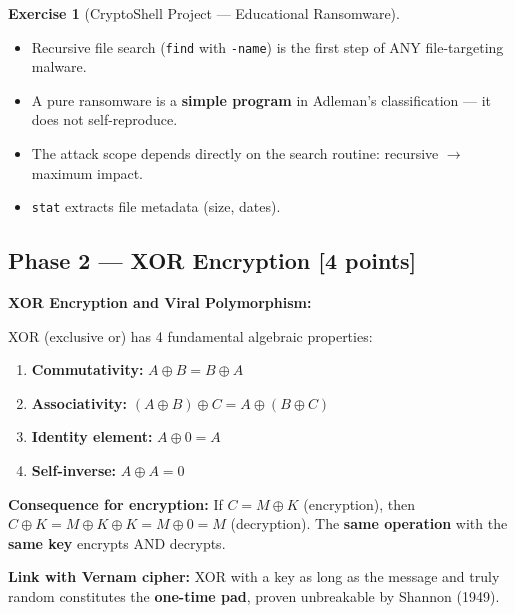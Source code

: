 \documentclass[a4paper,11pt]{article}
\theoremstyle{plain}
\theoremstyle{definition}
\newtheorem{exercice}{Exercise}
\begin{document}
\begin{exercice}[CryptoShell Project --- Educational Ransomware]
\begin{correction}
\begin{pointcle}
\begin{itemize}
    \item Recursive file search (\texttt{find} with \texttt{-name}) is the first step of ANY file-targeting malware.
    \item A pure ransomware is a \textbf{simple program} in Adleman's classification --- it does not self-reproduce.
    \item The attack scope depends directly on the search routine: recursive $\to$ maximum impact.
    \item \texttt{stat} extracts file metadata (size, dates).
\end{itemize}
\end{pointcle}

\end{correction}



\subsection*{Phase 2 --- XOR Encryption \hfill \normalsize [4 points]}

\begin{rappel}
\textbf{XOR Encryption and Viral Polymorphism:}

XOR (exclusive or) has 4 fundamental algebraic properties:
\begin{enumerate}
    \item \textbf{Commutativity:} $A \oplus B = B \oplus A$
    \item \textbf{Associativity:} $(A \oplus B) \oplus C = A \oplus (B \oplus C)$
    \item \textbf{Identity element:} $A \oplus 0 = A$
    \item \textbf{Self-inverse:} $A \oplus A = 0$
\end{enumerate}

\medskip
\textbf{Consequence for encryption:} If $C = M \oplus K$ (encryption), then $C \oplus K = M \oplus K \oplus K = M \oplus 0 = M$ (decryption). The \textbf{same operation} with the \textbf{same key} encrypts AND decrypts.

\medskip
\textbf{Link with Vernam cipher:} XOR with a key as long as the message and truly random constitutes the \textbf{one-time pad}, proven unbreakable by Shannon (1949).


\end{rappel}
\end{exercice}
\end{document}
